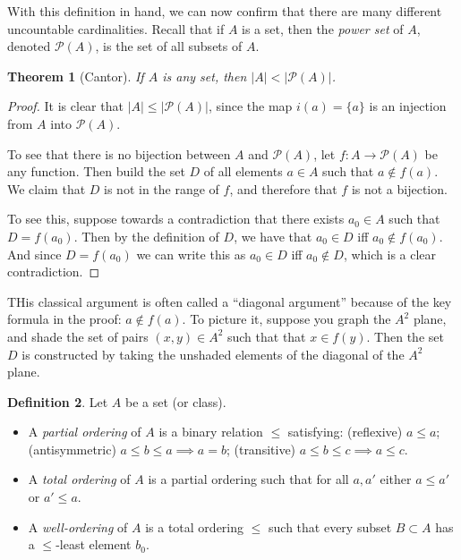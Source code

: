 \documentclass[11pt,oneside]{amsbook}
\theoremstyle{definition}
\theoremstyle{plain}
\newtheorem{theorem}{Theorem}[section]
\theoremstyle{definition}
\newtheorem{definition}[theorem]{Definition}
\theoremstyle{remark}
\numberwithin{equation}{section}
\numberwithin{figure}{section}
\begin{document}
With this definition in hand, we can now confirm that there are many different uncountable cardinalities. Recall that if $A$ is a set, then the \emph{power set} of $A$, denoted $\mathcal P(A)$, is the set of all subsets of $A$.

\begin{theorem}[Cantor]
  If $A$ is any set, then $|A|<|\mathcal P(A)|$.
\end{theorem}

\begin{proof}
  It is clear that $|A|\leq|\mathcal P(A)|$, since the map $i(a)=\{a\}$ is an injection from $A$ into $\mathcal P(A)$.

  To see that there is no bijection between $A$ and $\mathcal P(A)$, let $f\colon A\to\mathcal P(A)$ be any function. Then build the set $D$ of all elements $a\in A$ such that $a\notin f(a)$. We claim that $D$ is not in the range of $f$, and therefore that $f$ is not a bijection.

  To see this, suppose towards a contradiction that there exists $a_0\in A$ such that $D=f(a_0)$. Then by the definition of $D$, we have that $a_0\in D$ iff $a_0\notin f(a_0)$. And since $D=f(a_0)$ we can write this as $a_0\in D$ iff $a_0\notin D$, which is a clear contradiction.
\end{proof}

THis classical argument is often called a ``diagonal argument'' because of the key formula in the proof: $a\notin f(a)$. To picture it, suppose you graph the $A^2$ plane, and shade the set of pairs $(x,y)\in A^2$ such that that $x\in f(y)$. Then the set $D$ is constructed by taking the unshaded elements of the diagonal of the $A^2$ plane.

\begin{definition}
  Let $A$ be a set (or class).
  \begin{itemize}
    \item A \emph{partial ordering} of $A$ is a binary relation $\leq$ satisfying: (reflexive) $a\leq a$; (antisymmetric) $a\leq b\leq a\implies a=b$; (transitive) $a\leq b\leq c\implies a\leq c$.
    \item A \emph{total ordering} of $A$ is a partial ordering such that for all $a,a'$ either $a\leq a'$ or $a'\leq a$.
    \item A \emph{well-ordering} of $A$ is a total ordering $\leq$ such that every subset $B\subset A$ has a $\leq$-least element $b_0$.
  \end{itemize}
\end{definition}
\end{document}

